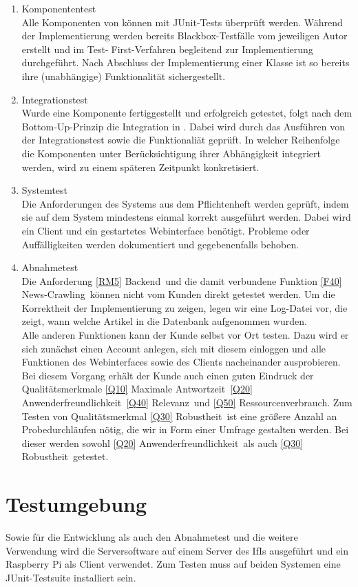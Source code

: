 \begin{enumerate}

\item{Komponententest}\\
Alle Komponenten von \NewsGenie können mit JUnit-Tests überprüft werden.
Während der Implementierung werden bereits Blackbox-Testfälle vom jeweiligen Autor
erstellt und im Test-First-Verfahren begleitend zur Implementierung
durchgeführt. Nach Abschluss der Implementierung einer Klasse ist so bereits ihre (unabhängige) Funktionalität sichergestellt.
\item{Integrationstest}\\
Wurde eine Komponente fertiggestellt und erfolgreich getestet, folgt nach
dem Bottom-Up-Prinzip die Integration in \NewsGenie. Dabei wird durch das
Ausführen von \NewsGenie der Integrationstest sowie die Funktionaliät geprüft.
In welcher Reihenfolge die Komponenten unter Berücksichtigung ihrer Abhängigkeit integriert
werden, wird zu einem späteren Zeitpunkt konkretisiert.
\item{Systemtest}\\
Die Anforderungen des Systems aus dem Pflichtenheft werden geprüft, indem sie
auf dem System mindestens einmal korrekt ausgeführt werden. Dabei wird ein Client
und ein gestartetes Webinterface benötigt. Probleme oder Auffälligkeiten werden
dokumentiert und gegebenenfalls behoben.
\item{Abnahmetest}\\
Die Anforderung \ref{RM5} \glqq Backend\grqq\ und die damit verbundene Funktion \ref{F40} \glqq News-Crawling\grqq\ können nicht vom Kunden direkt getestet werden. Um die Korrektheit der Implementierung zu zeigen, legen wir eine Log-Datei vor, die zeigt, wann welche Artikel in die Datenbank aufgenommen wurden. \\
Alle anderen Funktionen kann der Kunde selbst vor Ort testen. Dazu wird er sich zunächst einen Account anlegen, sich mit diesem einloggen und alle Funktionen des Webinterfaces sowie des Clients nacheinander ausprobieren. Bei diesem Vorgang erhält der Kunde auch einen guten Eindruck der Qualitätsmerkmale \ref{Q10} \glqq Maximale Antwortzeit\grqq\, \ref{Q20} \glqq Anwenderfreundlichkeit\grqq\, \ref{Q40} \glqq Relevanz\grqq\ und \ref{Q50} \glqq Ressourcenverbrauch\grqq . Zum Testen von Qualitätsmerkmal \ref{Q30} \glqq Robustheit\grqq\ ist eine größere Anzahl an Probedurchläufen nötig, die wir in Form einer Umfrage gestalten werden. Bei dieser werden sowohl \ref{Q20} \glqq Anwenderfreundlichkeit\grqq\ als auch \ref{Q30} \glqq Robustheit\grqq\ getestet.
\end{enumerate}


\section{Testumgebung}

Sowie für die Entwicklung als auch den Abnahmetest und die weitere Verwendung wird die Serversoftware auf einem Server des IfIs ausgeführt und ein Raspberry Pi als Client verwendet. Zum Testen muss auf beiden Systemen eine JUnit-Testsuite installiert sein.
